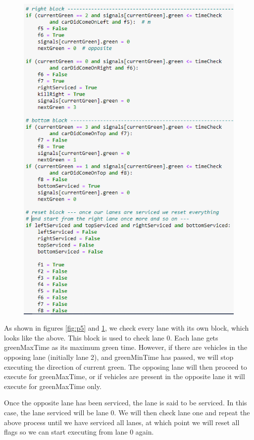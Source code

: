 \documentclass[12pt, a4paper,titlepage]{article}
\begin{document}
\begin{figure}[H]
	\centering
	\includegraphics[width=\linewidth]{images/p6}
	\caption{}
	\label{fig:p6}
\end{figure}

As shown in figures \ref{fig:p5} and \ref{fig:p6}, we check every lane with its own block, which looks like the above. This block is used to check lane 0. Each lane gets greenMaxTime as its maximum green time. However, if there are vehicles in the opposing lane (initially lane 2), and greenMinTime has passed, we will stop executing the direction of current green. The opposing lane will then proceed to execute for greenMaxTime, or if vehicles are present in the opposite lane it will execute for greenMaxTime only. 

Once the opposite lane has been serviced, the lane is said to be serviced. In this case, the lane serviced will be lane 0. We will then check lane one and repeat the above process until we have serviced all lanes, at which point we will reset all flags so we can start executing from lane 0 again.\\
\end{document}
